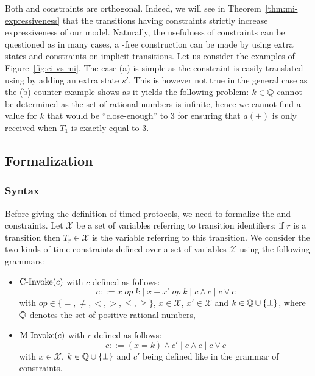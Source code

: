 Both \CInvoke and \MInvoke constraints are orthogonal. Indeed, we will see in Theorem~\ref{thm:mi-expressiveness} that the transitions having \MInvoke constraints strictly increase expressiveness of our model. Naturally, the usefulness of \CInvoke constraints can be questioned as in many cases, a \CInvoke-free construction can be made by using extra states and \MInvoke constraints on implicit transitions. Let us consider the examples of Figure~\ref{fig:ci-vs-mi}. The case (a) is simple as the \CInvoke constraint is easily translated using \MInvoke by adding an extra state $s'$.
This is however not true in the general case as the (b) counter example shows as it yields the following problem: $k \in \mathbb{Q}$ cannot be determined as the set of rational numbers is infinite, hence we cannot find a value for $k$ that would be ``close-enough'' to $3$ for ensuring that $a(+)$ is only received when $T_1$ is exactly equal to $3$.


\subsection{Formalization}


\subsubsection{Syntax}


Before giving the definition of timed protocols, we need to formalize the \CInvoke and \MInvoke constraints.
Let $\mathcal{X}$ be a set of variables referring to transition identifiers: if $r$ is a transition then $T_r \in {\mathcal{X}}$ is the variable referring to this transition. We consider the two kinds of time constraints defined over a set of variables $\mathcal{X}$ using the following grammars:
\begin{itemize}

    \item $\mbox{C-Invoke}{(c)}$ with  $c$ defined as follows:
    $$ c ::= x \; op \; k \; | \; x - x' \; op \; k \; | \; c \wedge c \; | \; c \vee c $$
    with  $op \in \{=, \neq, <, >, \leq, \geq\}$,
     $x \in \mathcal{X}$, $x' \in \mathcal{X}$ and $k \in \mathbb{Q} \cup \{ \perp \}$, where $\mathbb{Q}$ denotes the set of positive rational numbers,

    \item $\mbox{M-Invoke}{(c)}$ with $c$ defined as follows:
    $$ c ::= (x = k) \wedge c' \; | \; c \wedge c \; | \; c \vee c $$
    with $x \in \mathcal{X}$, $k \in \mathbb{Q} \cup \{ \perp \}$ and $c'$ being defined like in the grammar of \CInvoke constraints.

\end{itemize}

